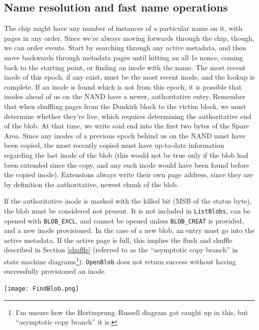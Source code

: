 \documentclass[letterpaper,10pt]{article}
\begin{document}
\subsection{Name resolution and fast name operations}
The chip might have any number of instances of a particular name on it, with
pages in any order. Since we're always moving forwards through the chip, though,
we can order events. Start by searching through any active metadata, and then move
backwards through metadata pages until hitting an all 1s nonce, coming back to
the starting point, or finding an inode with the name. The most recent inode
of this epoch, if any exist, must be the most recent inode, and the lookup is
complete. If an inode is found which is not from this epoch, it is possible that
inodes ahead of us on the NAND have a newer, authoritative entry. Remember that
when shuffling pages from the Dunkirk block to the victim block, we must determine
whether they're live, which requires determining the authoritative end of the
blob. At that time, we write said end into the first two bytes of the Spare Area.
Since any inodes of a previous epoch behind us on the NAND must have been copied,
the most recently copied must have up-to-date information regarding the last
inode of the blob (this would not be true only if the blob had been extended
since the copy, and any such inode would have been found before the copied
inode). Extensions always write their own page address, since they are by
definition the authoritative, newest chunk of the blob.

If the authoritative inode is marked with the killed bit (MSB of the status
byte), the blob must be considered not present. It is not included in
\texttt{ListBlobs}, can be opened with \texttt{BLOB\_EXCL}, and cannot be
opened unless \texttt{BLOB\_CREAT} is provided, and a new inode provisioned.
In the case of a new blob, an entry must go into the active metadata. If the
active page is full, this implies the flush and shuffle described in
Section \ref{shuffle} (referred to as the ``asymptotic copy branch'' in state
machine diagrams\footnote{I'm unsure how the Hertzsprung–Russell diagram got
caught up in this, but ``asymptotic copy branch'' it is.}). \texttt{OpenBlob}
does not return success without having successfully provisioned an inode.

\begin{minipage}{\textwidth}
\begin{center}
\texttt{[image: FindBlob.png]}
\end{center}
\end{minipage}
\end{document}
